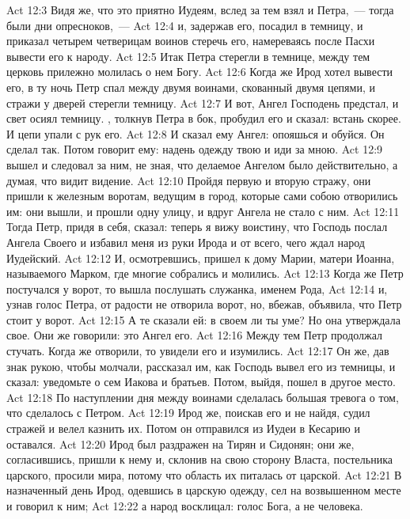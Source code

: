\vs Act 12:3 Видя же, что это приятно Иудеям, вслед за тем взял и Петра,~--- тогда были дни опресноков,~---
\vs Act 12:4 и, задержав его, посадил в темницу, и приказал четырем четверицам воинов стеречь его, намереваясь после Пасхи вывести его к народу.
\vs Act 12:5 Итак Петра стерегли в темнице, между тем церковь прилежно молилась о нем Богу.
\rsbpar\vs Act 12:6 Когда же Ирод хотел вывести его, в ту ночь Петр спал между двумя воинами, скованный двумя цепями, и стражи у дверей стерегли темницу.
\vs Act 12:7 И вот, Ангел Господень предстал, и свет осиял темницу. , толкнув Петра в бок, пробудил его и сказал: встань скорее. И цепи упали с рук его.
\vs Act 12:8 И сказал ему Ангел: опояшься и обуйся. Он сделал так. Потом говорит ему: надень одежду твою и иди за мною.
\vs Act 12:9  вышел и следовал за ним, не зная, что делаемое Ангелом было действительно, а думая, что видит видение.
\vs Act 12:10 Пройдя первую и вторую стражу, они пришли к железным воротам, ведущим в город, которые сами собою отворились им: они вышли, и прошли одну улицу, и вдруг Ангела не стало с ним.
\vs Act 12:11 Тогда Петр, придя в себя, сказал: теперь я вижу воистину, что Господь послал Ангела Своего и избавил меня из руки Ирода и от всего, чего ждал народ Иудейский.
\vs Act 12:12 И, осмотревшись, пришел к дому Марии, матери Иоанна, называемого Марком, где многие собрались и молились.
\vs Act 12:13 Когда же Петр постучался у ворот, то вышла послушать служанка, именем Рода,
\vs Act 12:14 и, узнав голос Петра, от радости не отворила ворот, но, вбежав, объявила, что Петр стоит у ворот.
\vs Act 12:15 А те сказали ей: в своем ли ты уме? Но она утверждала свое. Они же говорили: это Ангел его.
\vs Act 12:16 Между тем Петр продолжал стучать. Когда же отворили, то увидели его и изумились.
\vs Act 12:17 Он же, дав знак рукою, чтобы молчали, рассказал им, как Господь вывел его из темницы, и сказал: уведомьте о сем Иакова и братьев. Потом, выйдя, пошел в другое место.
\rsbpar\vs Act 12:18 По наступлении дня между воинами сделалась большая тревога о том, что сделалось с Петром.
\vs Act 12:19 Ирод же, поискав его и не найдя, судил стражей и велел казнить их. Потом он отправился из Иудеи в Кесарию и  оставался.
\rsbpar\vs Act 12:20 Ирод был раздражен на Тирян и Сидонян; они же, согласившись, пришли к нему и, склонив на свою сторону Власта, постельника царского, просили мира, потому что область их питалась от  царской.
\vs Act 12:21 В назначенный день Ирод, одевшись в царскую одежду, сел на возвышенном месте и говорил к ним;
\vs Act 12:22 а народ восклицал:  голос Бога, а не человека.
